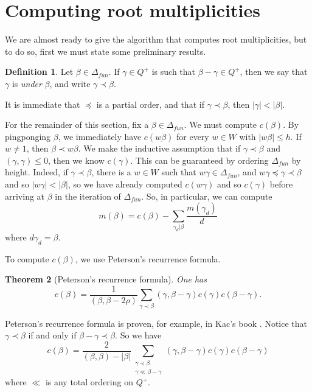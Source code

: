\documentclass[12pt]{report}
\newcommand{\dfn}[1]{\emph{#1}\index{#1}}
\newtheorem{theorem}{Theorem}[chapter]
\theoremstyle{definition}
\newtheorem{definition}[theorem]{Definition}
\begin{document}
\section{Computing root multiplicities}
	We are almost ready to give the algorithm that computes root multiplicities, but to do so, first we must state some preliminary results.
\begin{definition}
	Let $\beta \in \Delta_{fun}$. If $\gamma \in Q^+$ is such that $\beta - \gamma \in Q^+$, then we say that $\gamma$ is \dfn{under} $\beta$, and write $\gamma \prec \beta$.
\end{definition}
	It is immediate that $\preceq$ is a partial order, and that if $\gamma \prec \beta$, then $|\gamma| < |\beta|$.

	For the remainder of this section, fix a $\beta \in \Delta_{fun}$. We must compute $c(\beta)$. By pingponging $\beta$, we immediately have $c(w\beta)$ for every $w \in W$ with $|w\beta| \leq h$. If $w \neq 1$, then $\beta \prec w\beta$. We make the inductive assumption that if $\gamma \prec \beta$ and $(\gamma, \gamma) \leq 0$, then we know $c(\gamma)$. This can be guaranteed by ordering $\Delta_{fun}$ by height. Indeed, if $\gamma \prec \beta$, there is a $w \in W$ such that $w\gamma \in \Delta_{fun}$, and $w\gamma \preceq \gamma \prec \beta$ and so $|w\gamma| < |\beta|$, so we have already computed $c(w\gamma)$ and so $c(\gamma)$ before arriving at $\beta$ in the iteration of $\Delta_{fun}$. So, in particular, we can compute
	$$m(\beta) = c(\beta) - \sum_{\gamma_d|\beta} \frac{m(\gamma_d)}{d}$$
	where $d\gamma_d = \beta$.

To compute $c(\beta)$, we use Peterson's recurrence formula.
\begin{theorem}[Peterson's recurrence formula]
	One has
	$$c(\beta) = \frac{1}{( \beta, \beta - 2\rho)}\sum_{\gamma \prec \beta} ( \gamma, \beta - \gamma ) c(\gamma) c(\beta - \gamma).$$
\end{theorem}
Peterson's recurrence formula is proven, for example, in Kac's book \cite{kac_2014}. Notice that $\gamma \prec \beta$ if and only if $\beta - \gamma \prec \beta$. So we have
$$c(\beta) = \frac{2}{( \beta, \beta) - |\beta|}\sum_{\substack{\gamma \prec \beta\\\gamma \ll \beta - \gamma}} ( \gamma, \beta - \gamma ) c(\gamma) c(\beta - \gamma)$$
where $\ll$ is any total ordering on $Q^+$.
\end{document}
